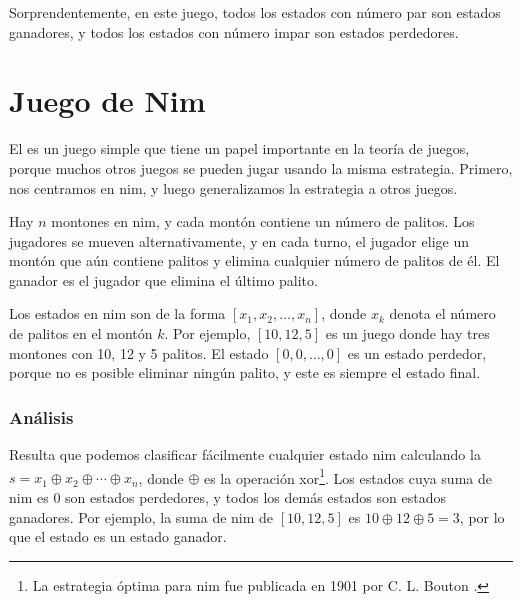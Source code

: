 \begin{center}
\end{center}

Sorprendentemente, en este juego,
todos los estados con número par son estados ganadores,
y todos los estados con número impar son estados perdedores.

\section{Juego de Nim}


El  es un juego simple que
tiene un papel importante en la teoría de juegos,
porque muchos otros juegos se pueden jugar usando
la misma estrategia.
Primero, nos centramos en nim,
y luego generalizamos la estrategia
a otros juegos.

Hay $n$ montones en nim,
y cada montón contiene un número de palitos.
Los jugadores se mueven alternativamente,
y en cada turno, el jugador elige
un montón que aún contiene palitos
y elimina cualquier número de palitos de él.
El ganador es el jugador que elimina el último palito.

Los estados en nim son de la forma
$[x_1,x_2,\ldots,x_n]$,
donde $x_k$ denota el número de palitos en el montón $k$.
Por ejemplo, $[10,12,5]$ es un juego donde
hay tres montones con 10, 12 y 5 palitos.
El estado $[0,0,\ldots,0]$ es un estado perdedor,
porque no es posible eliminar ningún palito,
y este es siempre el estado final.

\subsubsection{Análisis}

Resulta que podemos clasificar fácilmente
cualquier estado nim calculando
la  $s = x_1 \oplus x_2 \oplus \cdots \oplus x_n$,
donde $\oplus$ es la operación xor\footnote{La estrategia óptima
para nim fue publicada en 1901 por C. L. Bouton \cite{bou01}.}.
Los estados cuya suma de nim es 0 son estados perdedores,
y todos los demás estados son estados ganadores.
Por ejemplo, la suma de nim de
$[10,12,5]$ es $10 \oplus 12 \oplus 5 = 3$,
por lo que el estado es un estado ganador.

